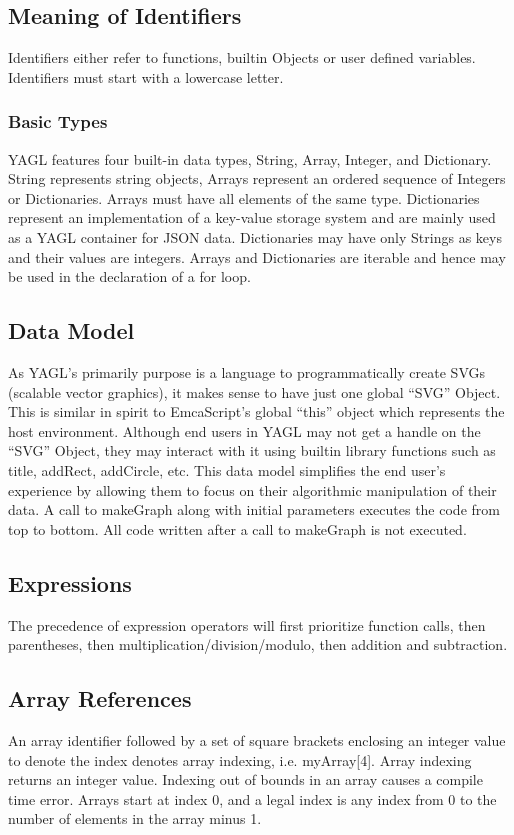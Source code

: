 \documentclass[12pt]{article}
\begin{document}
\subsection{Meaning of Identifiers}
Identifiers either refer to functions, builtin Objects or user defined variables.  Identifiers must start with a lowercase letter.

\subsubsection{Basic Types}
YAGL features four built-in data types, String, Array, Integer, and Dictionary. String represents string objects, Arrays represent an ordered sequence of Integers or Dictionaries. Arrays must have all elements of the same type.  Dictionaries represent an implementation of a key-value storage system and are mainly used as a YAGL container for JSON data. Dictionaries may have only Strings as keys and their values are integers. Arrays and Dictionaries are iterable and hence may be used in the declaration of a for loop. 

\subsection{Data Model}
As YAGL’s primarily purpose is a language to programmatically create SVGs (scalable vector graphics), it makes sense to have just one global “SVG” Object. This is similar in spirit to EmcaScript’s global “this” object which represents the host environment. Although end users in YAGL may not get a handle  on the “SVG” Object, they may interact with it using builtin library functions such as title, addRect, addCircle, etc. This data model simplifies the end user’s experience by allowing them to focus on their algorithmic manipulation of their data. A call to makeGraph along with initial parameters executes the code from top to bottom. All code written after a call to makeGraph is not executed. 

\subsection{Expressions}
The precedence of expression operators will first prioritize function calls, then parentheses, then multiplication/division/modulo, then addition and subtraction.  

\subsection{Array References}
An array identifier followed by a set of square brackets enclosing an integer value to denote the index denotes array indexing, i.e. myArray[4].  Array indexing returns an integer value.  Indexing out of bounds in an array causes a compile time error.  Arrays start at index 0, and a legal index is any index from 0 to the number of elements in the array minus 1.
\end{document}
